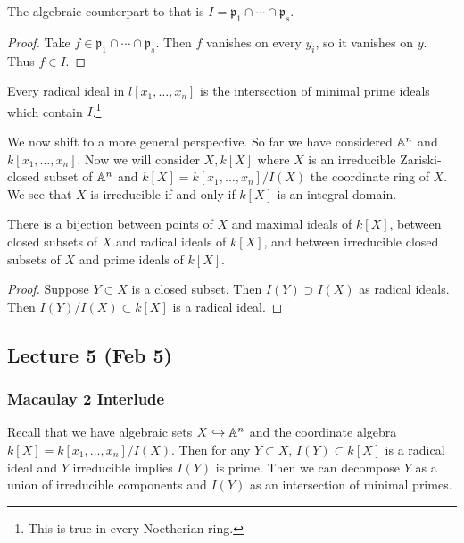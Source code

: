 \documentclass[twoside, 10pt]{article}
\begin{document}
    \begin{rmk}
        The algebraic counterpart to that is $I = \mathfrak{p}_1 \cap \cdots \cap \mathfrak{p}_s$.
        \begin{proof}
            Take $f \in \mathfrak{p}_1 \cap \cdots \cap \mathfrak{p}_s$. Then $f$ vanishes on every $y_i$, so it vanishes on $y$. Thus $f \in I$.
        \end{proof}
    \end{rmk}

    \begin{thm}
        Every radical ideal in $l[x_1, \ldots, x_n]$ is the intersection of minimal prime ideals which contain $I$.\footnote{This is true in every Noetherian ring.}
    \end{thm}

    We now shift to a more general perspective. So far we have considered $\mathbb{A}^n$ and $k[x_1, \ldots, x_n]$. Now we will consider $X,k[X]$ where $X$ is an irreducible Zariski-closed subset of $\mathbb{A}^n$ and $k[X] = k[x_1, \ldots, x_n]/I(X)$ the coordinate ring of $X$. We see that $X$ is irreducible if and only if $k[X]$ is an integral domain.

    \begin{thm}
        There is a bijection between points of $X$ and maximal ideals of $k[X]$, between closed subsets of $X$ and radical ideals of $k[X]$, and between irreducible closed subsets of $X$ and prime ideals of $k[X]$.
        \begin{proof}
            Suppose $Y \subset X$ is a closed subset. Then $I(Y) \supset I(X)$ as radical ideals. Then $I(Y)/I(X) \subset k[X]$ is a radical ideal.
        \end{proof}
    \end{thm}

    \subsection{Lecture 5 (Feb 5)}

    \subsubsection{Macaulay 2 Interlude}
    Recall that we have algebraic sets $X \hookrightarrow \mathbb{A}^n$ and the coordinate algebra $k[X] = k[x_1, \ldots, x_n]/I(X)$. Then for any $Y \subset X$, $I(Y) \subset k[X]$ is a radical ideal and $Y$ irreducible implies $I(Y)$ is prime. Then we can decompose $Y$ as a union of irreducible components and $I(Y)$ as an intersection of minimal primes.
\end{document}
